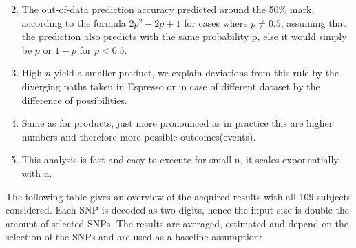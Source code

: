 \documentclass[letterpaper, 11pt]{article}
\begin{document}
\begin{enumerate} 
\setcounter{enumi}{1}
\item The out-of-data prediction accuracy predicted around the 50\% mark, according to the formula $2p^2-2p+1$ for cases where $p\neq 0.5$, assuming that the prediction also predicts with the same probability p, else it would simply be $p$ or $1-p$ for $p<0.5$.
\setcounter{enumi}{3}
\item High $n$ yield a smaller product, we explain deviations from this rule by the diverging paths taken in Espresso or in case of different dataset by the difference of possibilities. 
\item Same as for products, just more pronounced as in practice this are higher numbers and therefore more possible outcomes(events). 
\item This analysis is fast and easy to execute for small n, it scales exponentially with n. 
\end{enumerate}


The following table gives an overview of the acquired results with all 109 subjects considered. Each SNP is decoded as two digits, hence the input size is double the amount of selected SNPs. The results are averaged, estimated and depend on the selection of the SNPs and are used as a baseline assumption:
\end{document}
